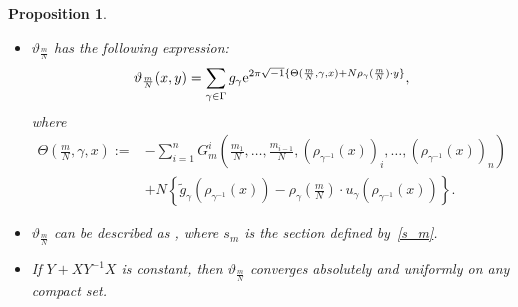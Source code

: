 \documentclass[10pt,a4paper]{amsart}
\numberwithin{equation}{section}
\newtheorem{Proposition}[Theorem]{Proposition}
 { \theoremstyle{definition}
\newtheorem{Definition}[Theorem]{Definition}
\newtheorem{Note}[Theorem]{Note}
\newtheorem{Example}[Theorem]{Example}
\newtheorem{Remark}[Theorem]{Remark} }
\renewcommand{\tilde}{\widetilde}
\newcommand{\vardbtilde}[1]{\tilde{\raisebox{0pt}[0.85\height]{$\tilde{#1}$}}}
\begin{document}
\begin{Proposition}\label{expression of theta}\quad
\begin{itemize}\itemsep=0pt
\item[$(1)$] $\vartheta_{\frac{m}{N}}$ has the following expression:
\begin{align*}%
\vartheta_{\frac{m}{N}}(x,y)
=\sum_{\gamma \in \Gamma}g_\gamma {\rm e}^{2\pi\sqrt{-1}\{\Theta (\frac{m}{N}, \gamma, x)+N\rho_\gamma (\frac{m}{N})\cdot y\}},
\end{align*}
where
\begin{align*}
\Theta \left(\frac{m}{N}, \gamma, x\right):={}&-\sum_{i=1}^nG_m^i\left(\frac{m_1}{N},\ldots ,\frac{m_{i-1}}{N},(\rho_{\gamma^{-1}}(x))_i,\ldots ,(\rho_{\gamma^{-1}}(x))_n\right)\\
&+N\left\{{\tilde g}_\gamma (\rho_{\gamma^{-1}}(x))-\rho_\gamma \left(\frac{m}{N}\right)\cdot u_\gamma (\rho_{\gamma^{-1}}(x))\right\}.
\end{align*}
\item[$(2)$] $\vartheta_{\frac{m}{N}}$ can be described as \smash{$\vartheta_{\frac{m}{N}}\!=\!\sum_{\gamma \in \Gamma}{\vardbtilde \rho}_\gamma \circ s_m\circ {\tilde \rho}_{\gamma^{-1}}$}, where $s_m$ is the section defined by~\eqref{s_m}.
\item[$(3)$] If $Y+XY^{-1}X$ is constant, then $\vartheta_{\frac{m}{N}}$ converges absolutely and uniformly on any compact set.
\end{itemize}
\end{Proposition}
\end{document}
